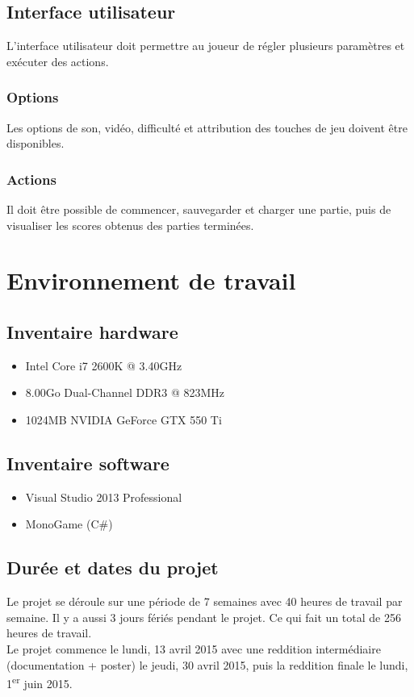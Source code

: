 \documentclass[11pt, a4paper, oneside]{report}
\begin{document}
\subsection{Interface utilisateur}
L'interface utilisateur doit permettre au joueur de régler plusieurs paramètres et exécuter des actions.

\subsubsection{Options}
Les options de son, vidéo, difficulté et attribution des touches de jeu doivent être disponibles.
\subsubsection{Actions}
Il doit être possible de commencer, sauvegarder et charger une partie, puis de visualiser les scores obtenus des parties terminées.

\section{Environnement de travail}
\subsection{Inventaire hardware}
\begin{itemize}
	\item Intel Core i7 2600K @ 3.40GHz
	\item 8.00Go Dual-Channel DDR3 @ 823MHz
	\item 1024MB NVIDIA GeForce GTX 550 Ti
\end{itemize}

\subsection{Inventaire software}
\begin{itemize}
	\item Visual Studio 2013 Professional
	\item MonoGame (C\#)
\end{itemize}

\subsection{Durée et dates du projet}
Le projet se déroule sur une période de 7 semaines avec 40 heures de travail par semaine. Il y a aussi 3 jours fériés pendant le projet. Ce qui fait un total de 256 heures de travail.\\[0.3cm]
Le projet commence le lundi, 13 avril 2015 avec une reddition intermédiaire (documentation + poster) le jeudi, 30 avril 2015, puis la reddition finale le lundi, 1\textsuperscript{er} juin 2015.
\newpage
\end{document}
